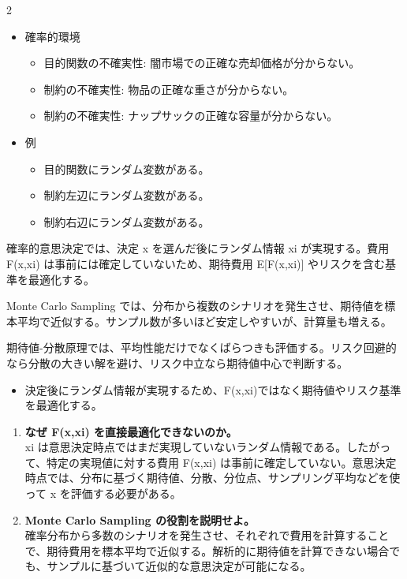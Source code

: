 \clearpage
{}
\begin{multicols}{2}\footnotesize\raggedcolumns
{}
\begin{itemize}
\item 確率的環境
\begin{itemize}
\item 目的関数の不確実性: 闇市場での正確な売却価格が分からない。
\item 制約の不確実性: 物品の正確な重さが分からない。
\item 制約の不確実性: ナップサックの正確な容量が分からない。
\end{itemize}
\item 例
\begin{itemize}
\item 目的関数にランダム変数がある。
\item 制約左辺にランダム変数がある。
\item 制約右辺にランダム変数がある。
\end{itemize}
\end{itemize}
確率的意思決定では、決定 x を選んだ後にランダム情報 xi が実現する。費用 F(x,xi) は事前には確定していないため、期待費用 E[F(x,xi)] やリスクを含む基準を最適化する。\par

Monte Carlo Sampling では、分布から複数のシナリオを発生させ、期待値を標本平均で近似する。サンプル数が多いほど安定しやすいが、計算量も増える。\par

期待値-分散原理では、平均性能だけでなくばらつきも評価する。リスク回避的なら分散の大きい解を避け、リスク中立なら期待値中心で判断する。\par
{}
\begin{itemize}
\item 決定後にランダム情報が実現するため、F(x,xi)ではなく期待値やリスク基準を最適化する。
\end{itemize}
\begin{enumerate}
\item \textbf{なぜ F(x,xi) を直接最適化できないのか。}\\xi は意思決定時点ではまだ実現していないランダム情報である。したがって、特定の実現値に対する費用 F(x,xi) は事前に確定していない。意思決定時点では、分布に基づく期待値、分散、分位点、サンプリング平均などを使って x を評価する必要がある。
\item \textbf{Monte Carlo Sampling の役割を説明せよ。}\\確率分布から多数のシナリオを発生させ、それぞれで費用を計算することで、期待費用を標本平均で近似する。解析的に期待値を計算できない場合でも、サンプルに基づいて近似的な意思決定が可能になる。
\end{enumerate}
\end{multicols}


